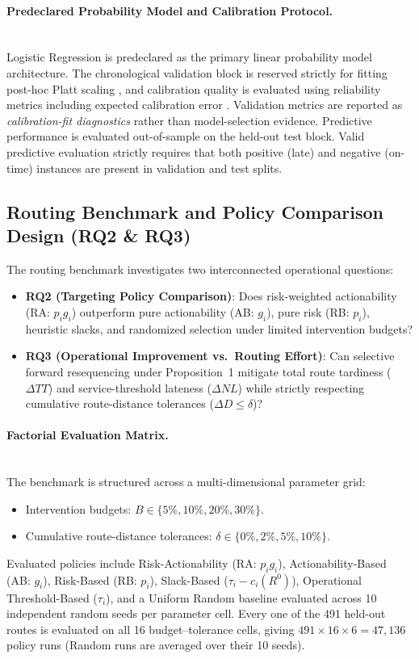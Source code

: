 \documentclass[11pt,a4paper]{article}
\begin{document}
\paragraph{Predeclared Probability Model and Calibration Protocol.}\mbox{}\\
Logistic Regression is predeclared as the primary linear probability model architecture. The chronological validation block is reserved strictly for fitting post-hoc Platt scaling \cite{platt1999}, and calibration quality is evaluated using reliability metrics including expected calibration error \cite{guo2017}. Validation metrics are reported as \emph{calibration-fit diagnostics} rather than model-selection evidence. Predictive performance is evaluated out-of-sample on the held-out test block. Valid predictive evaluation strictly requires that both positive (late) and negative (on-time) instances are present in validation and test splits.

\subsection{Routing Benchmark and Policy Comparison Design (RQ2 \& RQ3)}\label{sec:routing-benchmark-design}
The routing benchmark investigates two interconnected operational questions:
\begin{itemize}
    \item \textbf{RQ2 (Targeting Policy Comparison)}: Does risk-weighted actionability (RA: $p_i g_i$) outperform pure actionability (AB: $g_i$), pure risk (RB: $p_i$), heuristic slacks, and randomized selection under limited intervention budgets?
    \item \textbf{RQ3 (Operational Improvement vs.\ Routing Effort)}: Can selective forward resequencing under Proposition~1 mitigate total route tardiness ($\Delta TT$) and service-threshold lateness ($\Delta NL$) while strictly respecting cumulative route-distance tolerances ($\Delta D \le \delta$)?
\end{itemize}

\paragraph{Factorial Evaluation Matrix.}\mbox{}\\
The benchmark is structured across a multi-dimensional parameter grid:
\begin{itemize}
    \item Intervention budgets: $B \in \{5\%, 10\%, 20\%, 30\%\}$.
    \item Cumulative route-distance tolerances: $\delta \in \{0\%, 2\%, 5\%, 10\%\}$.
\end{itemize}
Evaluated policies include Risk-Actionability (RA: $p_i g_i$), Actionability-Based (AB: $g_i$), Risk-Based (RB: $p_i$), Slack-Based ($\tau_i - c_i(R^0)$), Operational Threshold-Based ($\tau_i$), and a Uniform Random baseline evaluated across 10 independent random seeds per parameter cell. Every one of the 491 held-out routes is evaluated on all 16 budget--tolerance cells, giving $491 \times 16 \times 6 = 47{,}136$ policy runs (Random runs are averaged over their 10 seeds).
\end{document}

